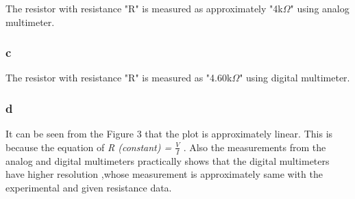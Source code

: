\documentclass[letterpaper,12pt]{article}
\begin{document}
The resistor with resistance "R" is measured as approximately "4k\(\Omega\)" using analog multimeter.
\subsubsection{c}

The resistor with resistance "R" is measured as  "4.60k\(\Omega\)" using digital multimeter.

\subsubsection{d}
It can be seen from the Figure 3 that the plot is approximately linear. This is because the equation of  \emph{ R (constant) = \(\frac{V}{I}\) } . Also the measurements from the analog and digital multimeters practically shows that the digital multimeters have higher resolution ,whose measurement is approximately same with the experimental and given resistance data.
\end{document}
